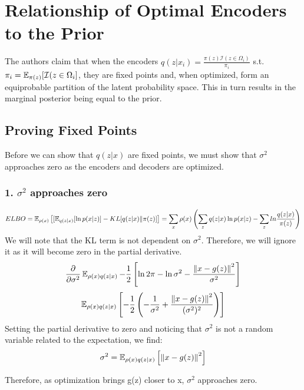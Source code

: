 \chapter*{Relationship of Optimal Encoders to the Prior}
The authors claim that when the encoders $q(z|x_{i}) = \frac{\pi(z)\mathcal{I}({z\in\Omega_{i}})}{\pi_{i}}$ s.t. $\pi_{i} = \operatorname{\mathbb{E}}_{\pi(z)}[\mathcal{I}(z\in\Omega_{i}]$, they are fixed points and, when optimized, form an equiprobable partition of the latent probability space. This in turn results in the marginal posterior being equal to the prior.

\section*{Proving Fixed Points}
Before we can show that $q(z|x)$ are fixed points, we must show that $\sigma^{2}$ approaches zero as the encoders and decoders are optimized.\\

\subsection*{1. $\sigma^2$ approaches zero}
\setcounter{equation}{0}
\begin{equation}
{ELBO} =  \operatorname{\mathbb{E}}_{\rho(x)}\left[[\operatorname{\mathbb{E}}_{q(z|x)}[\ln{p(x|z)}] - KL[q(z|x) \| \pi(z)]\right]
= \sum_{x}\rho(x)\left(\sum_{z} q(z|x) \ln{p(x|z)} - \sum_{z} ln \frac{q(z|x)}{\pi(z)}\right)
\end{equation}
We will note that the KL term is not dependent on $\sigma^2$. Therefore, we will ignore it as it will become zero in the partial derivative.
\begin{equation}
\frac{\partial}{\partial \sigma^2}\operatorname{\mathbb{E}}_{\rho(x)q(z|x)}-\frac{1}{2}\left[\ln{2\pi}-\ln{\sigma^2}-\frac{\left\lVert x-g(z)\right\rVert^2}{\sigma^2}\right]
\end{equation}
\begin{equation}
\operatorname{\mathbb{E}}_{\rho(x)q(z|x)}\left[-\frac{1}{2}\left(-\frac{1}{\sigma^2}+\frac{\left\lVert x-g(z)\right\rVert^2}{(\sigma^2)^2}\right)\right] 
\end{equation}
Setting the partial derivative to zero and noticing that $\sigma^{2}$ is not a random variable related to the expectation, we find:
\begin{equation}
\sigma^{2} = \operatorname{\mathbb{E}}_{\rho(x)q(z|x)}\left[\left\lVert x-g(z)\right\rVert^{2}\right]
\end{equation}

Therefore, as optimization brings g(z) closer to x, $\sigma^2$ approaches zero.


